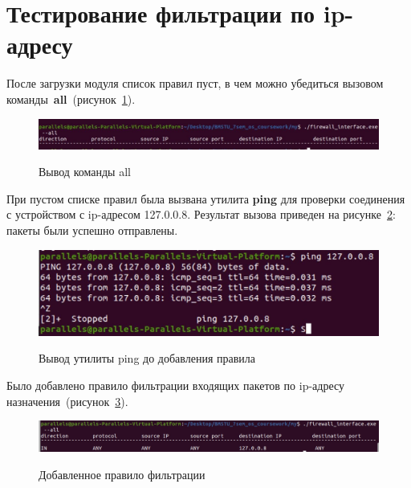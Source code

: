 \section{Тестирование фильтрации по ip-адресу}

После загрузки модуля список правил пуст, в чем можно убедиться вызовом команды~\textbf{all}~(рисунок~\ref{img:ip_fw_before}). 
	
\begin{figure}[h!]
	\begin{center}
		{\includegraphics[scale = 0.35]{inc/img/ip_fw_before.jpg}}
		\caption{Вывод команды all}
		\label{img:ip_fw_before}
	\end{center}
\end{figure}

При пустом списке правил была вызвана утилита \textbf{ping} для проверки соединения с устройством с ip-адресом 127.0.0.8. Результат вызова приведен на рисунке~\ref{img:ip_ping_before}: пакеты были успешно отправлены.

\begin{figure}[h!]
	\begin{center}
		{\includegraphics[scale = 0.4]{inc/img/ip_ping_before.jpg}}
		\caption{Вывод утилиты ping до добавления правила}
		\label{img:ip_ping_before}
	\end{center}
\end{figure}

Было добавлено правило фильтрации входящих пакетов по ip-адресу назначения~(рисунок~\ref{img:ip_rule}).

\begin{figure}[h!]
	\begin{center}
		{\includegraphics[scale = 0.2]{inc/img/ip_rule.jpg}}
		\caption{Добавленное правило фильтрации}
		\label{img:ip_rule}
	\end{center}
\end{figure}


